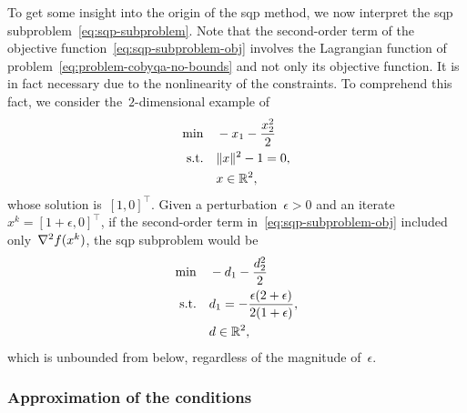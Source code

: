 To get some insight into the origin of the \gls{sqp} method, we now interpret the \gls{sqp} subproblem~\cref{eq:sqp-subproblem}.
Note that the second-order term of the objective function~\cref{eq:sqp-subproblem-obj} involves the Lagrangian function of problem~\cref{eq:problem-cobyqa-no-bounds} and not only its objective function.
It is in fact necessary due to the nonlinearity of the constraints.
To comprehend this fact, we consider the~$2$-dimensional example of \citeauthor{Boggs_Tolle_1995}~\cite{Boggs_Tolle_1995}
\begin{align*}
    \min        & \quad -x_1 - \frac{x_2^2}{2}\\
    \text{s.t.} & \quad \lVert x\rVert^2 - 1 = 0,\\
                & \quad x \in \mathbb{R}^2,
\end{align*}
whose solution is~$[1, 0]^{\top}$.
Given a perturbation~$\epsilon > 0$ and an iterate~$x^k = [1 + \epsilon, 0]^{\top}$, if the second-order term in~\cref{eq:sqp-subproblem-obj} included only~$\nabla^2 f(x^k)$, the \gls{sqp} subproblem would be
\begin{align*}
    \min        & \quad -d_1 - \frac{d_2^2}{2}\\
    \text{s.t.} & \quad d_1 = -\frac{\epsilon (2 + \epsilon)}{2 (1 + \epsilon)},\\
                & \quad d \in \mathbb{R}^2,
\end{align*}
which is unbounded from below, regardless of the magnitude of~$\epsilon$.

\subsubsection{Approximation of the  conditions}

